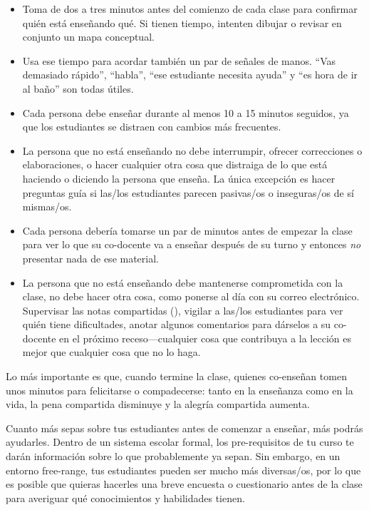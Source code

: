 \begin{itemize}

\item
  Toma de dos a tres minutos antes del comienzo de cada clase
  para confirmar quién está enseñando qué.
  Si tienen tiempo,
  intenten dibujar o revisar en conjunto un mapa conceptual.

\item
  Usa ese tiempo para acordar también un par de señales de manos.
  ``Vas demasiado rápido'',
  ``habla'',
  ``ese estudiante necesita ayuda''
  y ``es hora de ir al baño'' son todas útiles.

\item
  Cada persona debe enseñar durante al menos 10 a 15 minutos seguidos,
  ya que los estudiantes se distraen con cambios más frecuentes.

\item
  La persona que no está enseñando no debe interrumpir,
  ofrecer correcciones o elaboraciones,
  o hacer cualquier otra cosa que distraiga de lo que está haciendo o diciendo la persona que enseña.
  La única excepción es hacer preguntas guía
  si las/los estudiantes parecen pasivas/os o inseguras/os de sí mismas/os.
 
\item
  Cada persona debería tomarse un par de minutos antes de empezar la clase
  para ver lo que su co-docente va a enseñar después de su turno
  y entonces \emph{no} presentar nada de ese material.

\item
  La persona que no está enseñando debe mantenerse comprometida con la clase,
  no debe hacer otra cosa, como ponerse al día con su correo electrónico.
  Supervisar las notas compartidas (),
  vigilar a las/los estudiantes para ver quién tiene dificultades,
  anotar algunos comentarios para dárselos a su co-docente en el próximo receso---cualquier
  cosa que contribuya a la lección es mejor que cualquier cosa que no lo haga.
 
\end{itemize}

Lo más importante es que,
cuando termine la clase, quienes co-enseñan tomen unos minutos para felicitarse o compadecerse:
tanto en la enseñanza como en la vida,
la pena compartida disminuye y la alegría compartida aumenta.


Cuanto más sepas sobre tus estudiantes antes de comenzar a enseñar,
más podrás ayudarles.
Dentro de un sistema escolar formal,
los pre-requisitos de tu curso te darán información sobre
lo que probablemente ya sepan.
Sin embargo,
en un entorno free-range,
tus estudiantes pueden ser mucho más diversas/os,
por lo que es posible que quieras hacerles una breve encuesta o cuestionario antes de la clase
para averiguar qué conocimientos y habilidades tienen.

